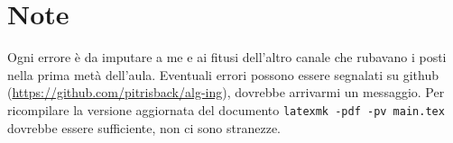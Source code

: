 \section*{Note}

Ogni errore è da imputare a me e ai fitusi dell'altro canale che rubavano i posti nella prima metà dell'aula.
Eventuali errori possono essere segnalati su github (\url{https://github.com/pitrisback/alg-ing}), dovrebbe arrivarmi un messaggio.
Per ricompilare la versione aggiornata del documento \texttt{latexmk -pdf -pv main.tex} dovrebbe essere sufficiente, non ci sono stranezze.
